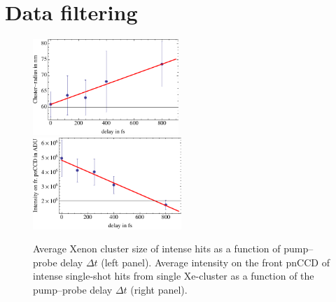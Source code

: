 \section{Data filtering}\label{sec:hitfinding}
\begin{figure}
	\centering
		\includegraphics[width=0.49\textwidth]{images/filter-size.pdf}
		\includegraphics[width=0.50\textwidth]{images/filter-sum-frontpnCCD.pdf}
	\caption[Average cluster size correlated to measured intensity on front pnCCD.]{Average Xenon cluster size of intense hits as a function of pump--probe delay $\Delta t$ (left panel). Average intensity on the front pnCCD of intense single-shot hits from single Xe-cluster as a function of the pump--probe delay $\Delta t$ (right panel).}
	\label{fig:filter-size-intensity}
\end{figure}
